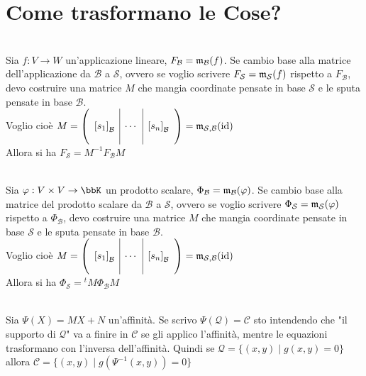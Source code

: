 \documentclass[a4paper,NoNotes,GeneralMath]{stdmdoc}
\begin{document}
	\section*{Come trasformano le Cose?}
	 \\
	Sia $f: V \rightarrow W$ un'applicazione lineare, $F_{\mathcal{B}} = \mathfrak{m}_{\mathcal{B}}(f)$. Se cambio base alla matrice dell'applicazione da $\mathcal{B}$ a $\mathcal{S}$, ovvero se voglio scrivere $F_{\mathcal{S}} = \mathfrak{m}_{\mathcal{S}}(f)$ rispetto a $F_{\mathcal{B}}$, devo costruire una matrice $M$ che mangia coordinate pensate in base $\mathcal{S}$ e le sputa pensate in base $\mathcal{B}$. \\
	Voglio cioè $M = \left( \begin{array}{c|c|c}  & & \\ {[s_1]}_{\mathcal{B}} & \cdots & {[s_n]}_{\mathcal{B}} \\  &  &  \\ \end{array} \right) = \mathfrak{m}_{\mathcal{S}, \mathcal{B}}(\mbox{id})$ \\
	Allora si ha $F_{\mathcal{S}} = M^{-1}F_{\mathcal{B}}M$

	 \\
	Sia $\varphi: V \times V \rightarrow \bbK$ un prodotto scalare, $\Phi_{\mathcal{B}} = \mathfrak{m}_{\mathcal{B}}(\varphi)$. Se cambio base alla matrice del prodotto scalare da $\mathcal{B}$ a $\mathcal{S}$, ovvero se voglio scrivere $\Phi_{\mathcal{S}} = \mathfrak{m}_{\mathcal{S}}(\varphi)$ rispetto a $\Phi_{\mathcal{B}}$, devo costruire una matrice $M$ che mangia coordinate pensate in base $\mathcal{S}$ e le sputa pensate in base $\mathcal{B}$. \\
	Voglio cioè $M = \left( \begin{array}{c|c|c} & & \\ {[s_1]}_{\mathcal{B}} & \cdots & {[s_n]}_{\mathcal{B}} \\ & & \\ \end{array} \right) = \mathfrak{m}_{\mathcal{S}, \mathcal{B}}(\mbox{id})$ \\
	Allora si ha $\Phi_{\mathcal{S}} = {}^tM\Phi_{\mathcal{B}}M$
	
	 \\
	Sia $\Psi(X) = MX+N$ un'affinità. Se scrivo $\Psi(\mathcal{Q}) = \mathcal{C}$ sto intendendo che "il supporto di $\mathcal{Q}$" va a finire in $\mathcal{C}$ se gli applico l'affinità, mentre le equazioni trasformano con l'inversa dell'affinità. Quindi se $\mathcal{Q} = \{(x,y) \mid g(x,y) = 0\}$ allora $\mathcal{C} = \{(x,y) \mid g(\Psi^{-1}(x,y)) = 0\}$
\end{document}
